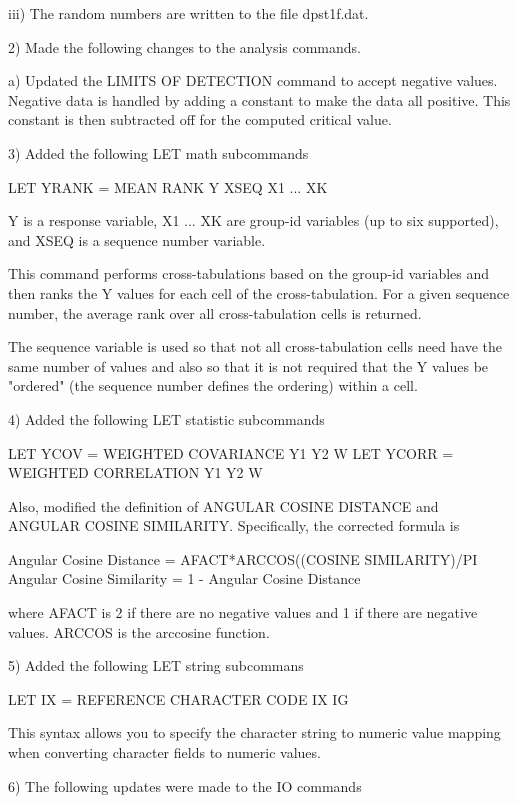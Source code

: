       iii) The random numbers are written to the file dpst1f.dat.

 2) Made the following changes to the analysis commands.

    a) Updated the LIMITS OF DETECTION command to accept negative values.
       Negative data is handled by adding a constant to make the data all
       positive.  This constant is then subtracted off for the computed
       critical value.

 3) Added the following LET math subcommands

      LET YRANK = MEAN RANK Y XSEQ X1 ... XK

    Y is a response variable, X1 ... XK are group-id variables (up to
    six supported), and XSEQ is a sequence number variable.

    This command performs cross-tabulations based on the group-id
    variables and then ranks the Y values for each cell of the
    cross-tabulation.  For a given sequence number, the average rank over
    all cross-tabulation cells is returned.

    The sequence variable is used so that not all cross-tabulation cells
    need have the same number of values and also so that it is not
    required that the Y values be "ordered" (the sequence number defines the
    ordering) within a cell.

 4) Added the following LET statistic subcommands

      LET YCOV  = WEIGHTED COVARIANCE  Y1 Y2 W
      LET YCORR = WEIGHTED CORRELATION Y1 Y2 W

    Also, modified the definition of ANGULAR COSINE DISTANCE and
    ANGULAR COSINE SIMILARITY.  Specifically, the corrected formula is

      Angular Cosine Distance = AFACT*ARCCOS((COSINE SIMILARITY)/PI
      Angular Cosine Similarity = 1 - Angular Cosine Distance

    where AFACT is 2 if there are no negative values and 1 if there
    are negative values.  ARCCOS is the arccosine function.

 5) Added the following LET string subcommans

       LET IX = REFERENCE CHARACTER CODE IX IG

    This syntax allows you to specify the character string to numeric
    value mapping when converting character fields to numeric values.

 6) The following updates were made to the IO commands

